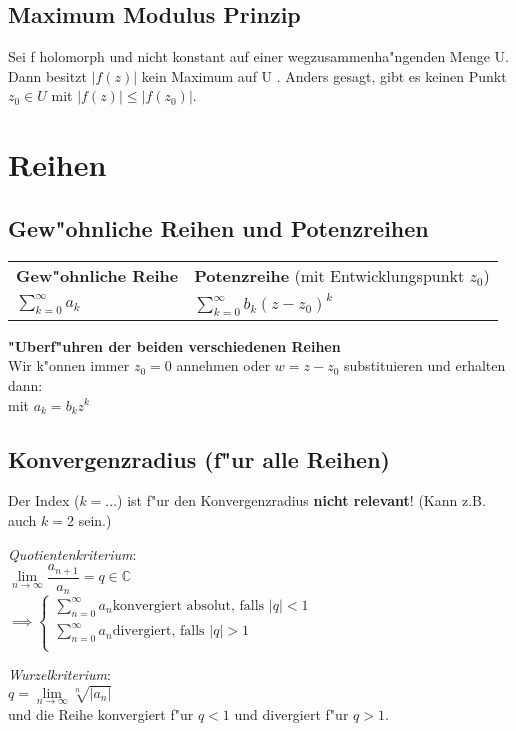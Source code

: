 \subsection{Maximum Modulus Prinzip}
Sei f holomorph und nicht konstant auf einer wegzusammenha"ngenden Menge U. Dann besitzt $|f (z)|$ kein Maximum
auf U . Anders gesagt, gibt es keinen Punkt $z_0 \in U$ mit $|f (z)| ≤ |f (z_0 )|.$


\section{Reihen}
\subsection{Gew"ohnliche Reihen und Potenzreihen}
\begin{tabular}{ll}
	\textbf{Gew"ohnliche Reihe}			&	\textbf{Potenzreihe} (mit Entwicklungspunkt \(z_0\))\\
	\(\sum\limits_{k=0}^\infty a_k\)			&	\(\sum\limits_{k=0}^\infty b_k (z-z_0)^k\)
\end{tabular}

\textbf{"Uberf"uhren der beiden verschiedenen Reihen}\\
Wir k"onnen immer \(z_0=0\) annehmen oder \(w=z-z_0\) substituieren und erhalten dann:\\
 mit \(a_k = b_k z^k\)

\subsection{Konvergenzradius (f"ur alle Reihen)}
Der Index (\(k=\dots\)) ist f"ur den Konvergenzradius \textbf{nicht relevant}! (Kann z.B. auch \(k=2\) sein.)

\emph{Quotientenkriterium}:\\
\(\lim\limits_{n\to \infty} \dfrac{a_{n+1}}{a_n} = q \in \mathbb{C}\)\\
\(\implies \begin{cases}
\sum\limits_{n=0}^\infty a_n \text{konvergiert absolut, falls }\vert q \vert < 1\\
\sum\limits_{n=0}^\infty a_n \text{divergiert, falls }\vert q \vert > 1\\
\end{cases}\)

\emph{Wurzelkriterium}:\\
\(q=\lim\limits_{n\to\infty} \sqrt[n]{\vert a_n \vert}\)\\
und die Reihe konvergiert f"ur \(q<1\) und divergiert f"ur \(q>1\).

